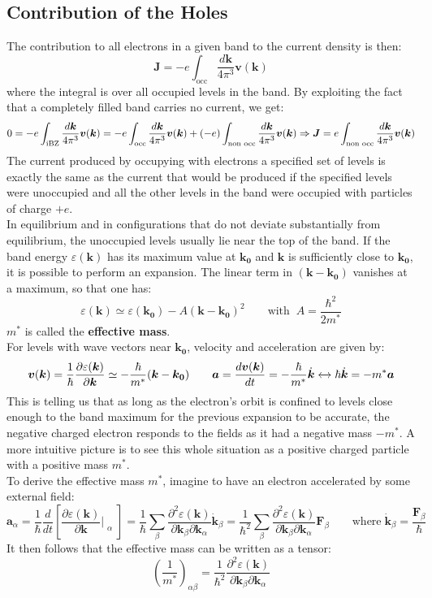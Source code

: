 \documentclass[10.75pt,a4paper,openright,bottom=2cm]{article}
\renewcommand{\Vec}[1]{\boldsymbol{#1}}
\newcommand{\RN}[1]{%
  \textup{\uppercase\expandafter{\romannumeral#1}}%
}
\begin{document}
\subsection{Contribution of the Holes}
The contribution to all electrons in a given band to the current density is then:
\[
\Vec{J}=-e\int_{\text{occ}}\frac{d\Vec{k}}{4\pi^3}\Vec{v}(\Vec{k})
\]
where the integral is over all occupied levels in the band. By exploiting the fact that a completely filled band carries no current, we get:
\[
0=-e\int_{\text{\RN{1}BZ}}\frac{d\Vec{k}}{4\pi^3}\Vec{v}(\Vec{k})=-e\int_{\text{occ}}\frac{d\Vec{k}}{4\pi^3}\Vec{v}(\Vec{k})+(-e)\int_{\text{non occ}}\frac{d\Vec{k}}{4\pi^3}\Vec{v}(\Vec{k})\Rightarrow\Vec{J}=e\int_{\text{non occ}}\frac{d\Vec{k}}{4\pi^3}\Vec{v}(\Vec{k})
\]
The current produced by occupying with electrons a specified set of levels is exactly the same as the current that would be produced if the specified levels were unoccupied and all the other levels in the band were occupied with particles of charge $+e$.\\
In equilibrium and in configurations that do not deviate substantially from equilibrium, the unoccupied levels usually lie near the top of the band. If the band energy $\varepsilon(\Vec{k})$ has its maximum value at $\Vec{k_0}$ and $\Vec{k}$ is sufficiently close to $\Vec{k_0}$, it is possible to perform an expansion. The linear term in $(\Vec{k}-\Vec{k_0})$ vanishes at a maximum, so that one has:
\[
\varepsilon(\Vec{k})\simeq \varepsilon(\Vec{k_0})-A(\Vec{k}-\Vec{k_0})^2 \qquad\text{with}\;\; A=\frac{\hbar^2}{2m^*}
\]
$m^*$ is called the \textbf{effective mass}.\\
For levels with wave vectors near $\Vec{k_0}$, velocity and acceleration are given by:
\[
\Vec{v}(\Vec{k})=\frac{1}{\hbar}\frac{\partial \varepsilon(\Vec{k})}{\partial\Vec{k}}\simeq-\frac{\hbar}{m^*}(\Vec{k}-\Vec{k_0}) \qquad \Vec{a}=\frac{d\Vec{v}(\Vec{k})}{dt}=-\frac{\hbar}{m^*}\Dot{\Vec{k}}\xleftrightarrow[]{}\hbar\Dot{\Vec{k}}=-m^*\Vec{a}
\]
This is telling us that as long as the electron's orbit is confined to levels close enough to the band maximum for the previous expansion to be accurate, the negative charged electron responds to the fields as it had a negative mass $-m^*$. A more intuitive picture is to see this whole situation as a positive charged particle with a positive mass $m^*$.\\
To derive the effective mass $m^*$, imagine to have an electron accelerated by some external field:
\[
\Vec{a}_\alpha=\frac{1}{\hbar}\frac{d}{dt}\left[\frac{\partial \varepsilon(\Vec{k})}{\partial\Vec{k}}\Bigr|_{\substack{\alpha}}\right]=\frac{1}{\hbar}\sum_\beta\frac{\partial^2\varepsilon(\Vec{k})}{\partial\Vec{k}_\beta\partial\Vec{k}_\alpha}\Dot{\Vec{k}}_\beta=\frac{1}{\hbar^2}\sum_\beta\frac{\partial^2\varepsilon(\Vec{k})}{\partial\Vec{k}_\beta\partial\Vec{k}_\alpha}\Vec{F}_\beta \qquad \text{where}\;\Dot{\Vec{k}}_\beta=\frac{\Vec{F}_\beta}{\hbar}
\]
It then follows that the effective mass can be written as a tensor:
\begin{equation}
\label{masstensor}
\left(\frac{1}{m^*}\right)_{\alpha\beta}=\frac{1}{\hbar^2}\frac{\partial^2\varepsilon(\Vec{k})}{\partial\Vec{k}_\beta\partial\Vec{k}_\alpha}
\end{equation}
\newpage
\end{document}

